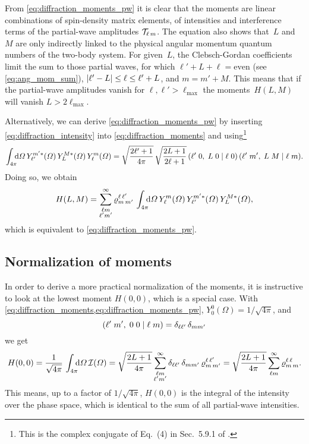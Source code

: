 From \cref{eq:diffraction_moments_pw} it is clear that the moments are
linear combinations of spin-density matrix elements, \ie of
intensities and interference terms of the partial-wave amplitudes
$\mathcal{T}_{\ell\, m}$.  The equation also shows that~$L$ and~$M$
are only indirectly linked to the physical angular momentum quantum
numbers of the two-body system.  For given~$L$, the Clebsch-Gordan
coefficients limit the sum to those partial waves, for which $\ell' +
L + \ell = \text{even}$ (see \cref{eq:ang_mom_sum}), $\vert{\ell' - L}\vert
\leq \ell \leq \ell' + L$, and $m = m' + M$.  This means that if the
partial-wave amplitudes vanish for $\ell, \ell' > \ell_\text{max}$ the
moments~$H(L, M)$ will vanish $L > 2 \ell_\text{max}$.

Alternatively, we can derive \cref{eq:diffraction_moments_pw} by
inserting \cref{eq:diffraction_intensity} into
\cref{eq:diffraction_moments} and using\footnote{This is the complex
conjugate of Eq.~(4) in Sec.~5.9.1 of .}
\begin{equation}
  \label{eq:spherical_harm_clebsch}
  \int_{4 \pi}\!\!\! \dif{\Omega}\,
  Y_{\ell'}^{m' *}(\Omega)\, Y_L^{M *}(\Omega)\, Y_{\ell}^m(\Omega)
  = \sqrt{\frac{2 \ell' + 1}{4 \pi}}\, \sqrt{\frac{2 L + 1}{2 \ell + 1}}\, \clebsch{\ell'}{0}{L}{0}{\ell}{0}\, \clebsch{\ell'}{m'}{L}{M}{\ell}{m}.
\end{equation}
Doing so, we obtain
\begin{equation}
  H(L, M)
  = \sum_{\substack{\ell m \\ \ell' m'}}^\infty
  \varrho^{\ell\, \ell'}_{m\, m'}\,
  \int_{4 \pi}\!\!\! \dif{\Omega}\,
  Y_\ell^m(\Omega)\,
  Y_{\ell'}^{m' *}(\Omega)\,
  Y_L^{M *}(\Omega),
\end{equation}
which is equivalent to \cref{eq:diffraction_moments_pw}.


\subsection{Normalization of moments}%
\label{sec:diffraction:moments_norm}

In order to derive a more practical normalization of the moments, it
is instructive to look at the lowest moment $H(0, 0)$, which is a
special case.  With
\cref{eq:diffraction_moments,eq:diffraction_moments_pw},
$Y_0^0(\Omega) = 1 / \sqrt{4 \pi}$, and
\begin{equation}
  ({\ell'}\;{m'},\;{0}\;{0}\; |\; {\ell}\;{m})
  = \delta_{\ell \ell'}\, \delta_{m m'}
\end{equation}
we get
\begin{equation}
  H(0, 0)
  = \frac{1}{\sqrt{4 \pi}}\, \int_{4 \pi}\!\!\! \dif{\Omega}\, \intensity(\Omega)
  = \sqrt{\frac{2 L + 1}{4 \pi}} \sum_{\substack{\ell m \\ \ell' m'}}^\infty \delta_{\ell \ell'}\, \delta_{m m'}\, \varrho^{\ell\, \ell'}_{m\, m'}
  = \sqrt{\frac{2 L + 1}{4 \pi}} \sum_{\ell m}^\infty \varrho^{\ell\, \ell}_{m\, m}.
\end{equation}
This means, up to a factor of $1 / \sqrt{4 \pi}$, $H(0, 0)$ is the
integral of the intensity over the phase space, which is identical to
the sum of all partial-wave intensities.


